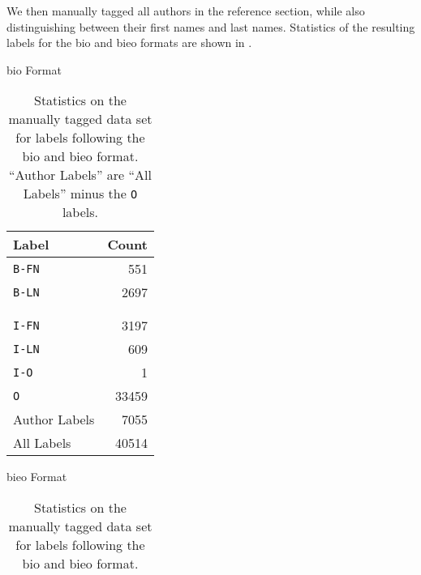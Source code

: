 We then manually tagged all authors in the reference section, while also distinguishing between their first names and last names.
Statistics of the resulting labels for the \gls{bio} and \gls{bieo} formats are shown in .
\begin{table}[t]
\centering
\begin{minipage}[t]{0.3\linewidth}
\centering
\gls{bio} Format\par
\smallskip
\begin{tabular}{l r}
  \toprule
  Label & Count\\
  \midrule
  \texttt{B-FN}    & \num{551}\\
  \texttt{B-LN}    & \num{2697}\\
                   & \\
                   & \\
  \texttt{I-FN}    & \num{3197}\\
  \texttt{I-LN}    & \num{609}\\
  \texttt{I-O}     & \num{1}\\
  \texttt{O}       & \num{33459}\\
  \midrule
  Author Labels    & \num{7055}\\
  All Labels       & \num{40514}\\
  \bottomrule
\end{tabular}
\end{minipage}
\quad
\begin{minipage}[t]{0.3\linewidth}
\centering
\gls{bieo} Format\par
\smallskip
\begin{tabular}{l r}
  \toprule
  Label & Count\\
  \midrule
  \texttt{B-FN}    & \num{551}\\
  \texttt{B-LN}    & \num{2697}\\
  \texttt{E-FN}    & \num{2655}\\
  \texttt{E-LN}    & \num{560}\\
  \texttt{I-FN}    & \num{542}\\
  \texttt{I-LN}    & \num{49}\\
  \texttt{I-O}     & \num{1}\\
  \texttt{O}       & \num{33459}\\
  \midrule
  Author Labels    & \num{7055}\\
  All Labels       & \num{40514}\\
  \bottomrule
\end{tabular}
\end{minipage}
\caption{Statistics on the manually tagged data set for labels following the \gls{bio} and \gls{bieo} format. ``Author Labels'' are ``All Labels'' minus the \texttt{O} labels.}
\label{tab:statistics-manually-tagged}
\end{table}
Note that our testing set contains exactly one word that has the label \texttt{I-O} for Intermediate Other.
This label is assigned to the misplaced comma in ``Wolff , S.'', which is part a reference string in \citet{morth1998spurensuche}.
Due to its relative insignificance, we do not consider this label in our learned model.

